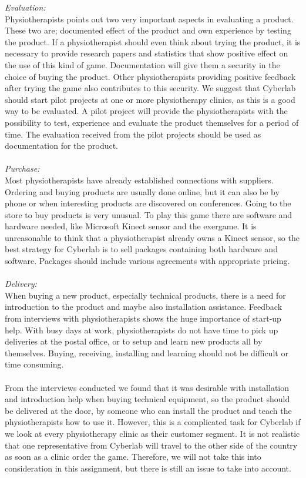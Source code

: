\emph{Evaluation:}\\
Physiotherapists points out two very important aspects in evaluating a product. These two are; documented effect of the product and own experience by testing the product. If a physiotherapist should even think about trying the product, it is necessary to provide research papers and statistics that show positive effect on the use of this kind of game. Documentation will give them a security in the choice of buying the product. Other physiotherapists providing positive feedback after trying the game also contributes to this security. We suggest that Cyberlab should start pilot projects at one or more physiotherapy clinics, as this is a good way to be evaluated. A pilot project will provide the physiotherapists with the possibility to test, experience and evaluate the product themselves for a period of time. The evaluation received from the pilot projects should be used as documentation for the product.\\ \\
\emph{Purchase:} \\
Most physiotherapists have already established connections with suppliers. Ordering and buying products are usually done online, but it can also be by phone or when interesting products are discovered on conferences. Going to the store to buy products is very unusual. To play this game there are software and hardware needed, like Microsoft Kinect sensor and the exergame. It is unreasonable to think that a physiotherapist already owns a Kinect sensor, so the best strategy for Cyberlab is to sell packages containing both hardware and software. Packages should include various agreements with appropriate pricing. \\ \\
\emph{Delivery:}\\
When buying a new product, especially technical products, there is a need for introduction to the product and maybe also installation assistance. Feedback from interviews with physiotherapists shows the huge importance of start-up help. With busy days at work, physiotherapists do not have time to pick up deliveries at the postal office, or to setup and learn new products all by themselves. Buying, receiving, installing and learning should not be difficult or time consuming. \\ \\
From the interviews conducted we found that it was desirable with installation and introduction help when buying technical equipment, so the product should be delivered at the door, by someone who can install the product and teach the physiotherapists how to use it. However, this is a complicated task for Cyberlab if we look at every physiotherapy clinic as their customer segment. It is not realistic that one representative from Cyberlab will travel to the other side of the country as soon as a clinic order the game. Therefore, we will not take this into consideration in this assignment, but there is still an issue to take into account.\\ \\
